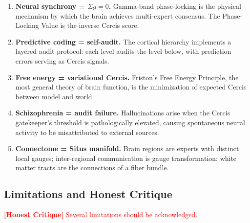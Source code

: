 \documentclass[12pt,a4paper]{article}
\theoremstyle{remark}
\newcommand{\Cercis}{\textsf{Cercis}}
\newcommand{\Situs}{\textsf{Situs}}
\newcommand{\honestcrit}[1]{\textcolor{red}{\textbf{[Honest Critique]} #1}}
\begin{document}
\begin{enumerate}[label=(\roman*)]
    \item \textbf{Neural synchrony = $\Sigma g = 0$.} Gamma-band phase-locking
          is the physical mechanism by which the brain achieves multi-expert
          consensus. The Phase-Locking Value is the inverse \Cercis{} score.
    \item \textbf{Predictive coding = self-audit.} The cortical hierarchy
          implements a layered audit protocol: each level audits the level
          below, with prediction errors serving as \Cercis{} signals.
    \item \textbf{Free energy = variational \Cercis.} Friston's Free Energy
          Principle, the most general theory of brain function, is the
          minimization of expected \Cercis{} between model and world.
    \item \textbf{Schizophrenia = audit failure.} Hallucinations arise when
          the \Cercis{} gatekeeper's threshold is pathologically elevated,
          causing spontaneous neural activity to be misattributed to external
          sources.
    \item \textbf{Connectome = \Situs{} manifold.} Brain regions are experts
          with distinct local gauges; inter-regional communication is gauge
          transformation; white matter tracts are the connections of a fiber
          bundle.
\end{enumerate}

\subsection{Limitations and Honest Critique}

\honestcrit{Several limitations should be acknowledged.}
\end{document}
